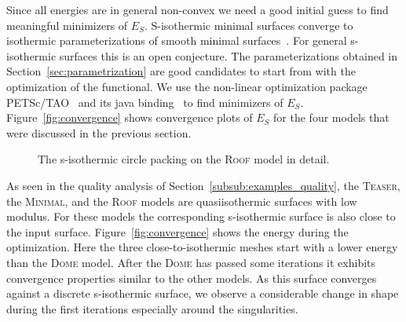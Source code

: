 \documentclass[Thesis.tex]{subfiles}
\begin{document}
Since all energies are in general non-convex we need a good initial guess to 
find meaningful minimizers of $E_S$.
S-isothermic minimal surfaces converge to isothermic parameterizations of
smooth minimal surfaces~\cite{BobHofSpr06}. For general s-isothermic surfaces
this is an open conjecture. The parameterizations obtained in
Section~\ref{sec:parametrization} are good candidates to start from with the
optimization of the functional.
We use the non-linear optimization package PETSc/TAO~\cite{petsc-web-page,
tao-user-ref} and its java binding~\cite{jpetsctao-web-page} to find
minimizers of $E_S$. Figure~\ref{fig:convergence} shows convergence plots of
$E_S$ for the four models that were discussed in the previous section.
\begin{figure}
\centering
{}
\caption{The s-isothermic circle packing on the \textsc{Roof} model in detail.}
\end{figure}

As seen in the quality analysis of Section~\ref{subsub:examples_quality}, the
\textsc{Teaser}, the \textsc{Minimal}, and the \textsc{Roof} models are
quasiisothermic surfaces with low modulus. For these models the corresponding s-isothermic
surface is also close to the input surface. Figure~\ref{fig:convergence} shows
the energy during the optimization. Here the three close-to-isothermic meshes
start with a lower energy than the \textsc{Dome} model. After the \textsc{Dome}
has passed some iterations it exhibits convergence properties similar to the
other models. As this surface converges against a discrete s-isothermic surface,
we observe a considerable change in shape during the first iterations
especially around the singularities.
\end{document}
